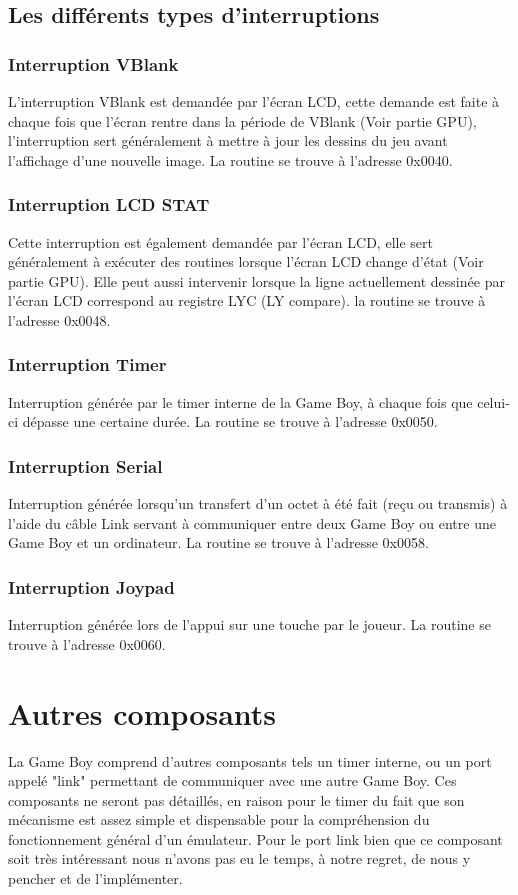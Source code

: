 \documentclass[french]{report}
\begin{document}
\subsection{Les différents types d'interruptions}
\subsubsection{Interruption VBlank}
L'interruption VBlank est demandée par l'écran LCD, cette demande est faite à chaque fois que l'écran rentre dans la période de VBlank (Voir partie GPU), l'interruption sert généralement à mettre à jour les dessins du jeu avant l'affichage d'une nouvelle image. La routine se trouve à l'adresse 0x0040.
\subsubsection{Interruption LCD STAT}
Cette interruption est également demandée par l'écran LCD, elle sert généralement à exécuter des routines lorsque l'écran LCD change d'état (Voir partie GPU). Elle peut aussi intervenir lorsque la ligne actuellement dessinée par l'écran LCD correspond au registre LYC (LY compare). la routine se trouve à l'adresse 0x0048.
\subsubsection{Interruption Timer}
Interruption générée par le timer interne de la Game Boy, à chaque fois que celui-ci dépasse une certaine durée. La routine se trouve à l'adresse 0x0050.
\subsubsection{Interruption Serial}
Interruption générée lorsqu'un transfert d'un octet à été fait (reçu ou transmis) à l'aide du câble Link servant à communiquer entre deux Game Boy ou entre une Game Boy et un ordinateur. La routine se trouve à l'adresse 0x0058.
\subsubsection{Interruption Joypad}
Interruption générée lors de l'appui sur une touche par le joueur. La routine se trouve à l'adresse 0x0060.
\section{Autres composants}
La Game Boy comprend d'autres composants tels un timer interne, ou un port appelé "link" permettant de communiquer avec une autre Game Boy. Ces composants ne seront pas détaillés, en raison pour le timer du fait que son mécanisme est assez simple et dispensable pour la compréhension du fonctionnement général d'un émulateur. Pour le port link bien que ce composant soit très intéressant nous n'avons pas eu le temps, à notre regret, de nous y pencher et de l'implémenter.
\end{document}
